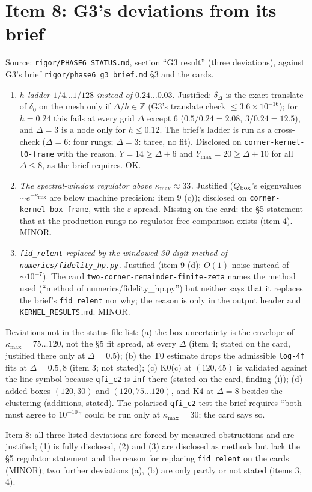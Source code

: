 \documentclass[11pt]{article}
\begin{document}
\section{Item 8: G3's deviations from its brief}
Source: \texttt{rigor/PHASE6\_STATUS.md}, section ``G3 result'' (three deviations), against G3's brief
\texttt{rigor/phase6\_g3\_brief.md} \S3 and the cards.
\begin{enumerate}[leftmargin=*]
\item \emph{$h$-ladder $1/4\ldots1/128$ instead of $0.24\ldots0.03$.} Justified: $\delta_\Delta$ is the exact translate of
$\delta_0$ on the mesh only if $\Delta/h\in\mathbb Z$ (G3's translate check $\le3.6\times10^{-16}$); for $h=0.24$ this fails at
every grid $\Delta$ except 6 ($0.5/0.24=2.08$, $3/0.24=12.5$), and $\Delta=3$ is a node only for $h\le0.12$. The brief's
ladder is run as a cross-check ($\Delta=6$: four rungs; $\Delta=3$: three, no fit). Disclosed on \texttt{corner-kernel-t0-frame}
with the reason. $Y=14\ge\Delta+6$ and $Y_{\max}=20\ge\Delta+10$ for all $\Delta\le8$, as the brief requires. OK.
\item \emph{The spectral-window regulator above $\kappa_{\max}\approx33$.} Justified ($Q_{\rm box}$'s eigenvalues
$\sim e^{-\kappa_{\max}}$ are below machine precision; item 9 (c)); disclosed on \texttt{corner-kernel-box-frame}, with the
$\varepsilon$-spread. Missing on the card: the \S5 statement that at the production rungs no regulator-free comparison exists
(item 4). MINOR.
\item \emph{\texttt{fid\_relent} replaced by the windowed 30-digit method of \texttt{numerics/fidelity\_hp.py}.} Justified
(item 9 (d): $O(1)$ noise instead of $\sim10^{-7}$). The card \texttt{two-corner-remainder-finite-zeta} names the method used
(``method of numerics/fidelity\_hp.py'') but neither says that it replaces the brief's \texttt{fid\_relent} nor why; the reason
is only in the output header and \texttt{KERNEL\_RESULTS.md}. MINOR.
\end{enumerate}
Deviations not in the status-file list: (a) the box uncertainty is the envelope of $\kappa_{\max}=75\ldots120$, not the \S5
fit spread, at every $\Delta$ (item 4; stated on the card, justified there only at $\Delta=0.5$); (b) the T0 estimate drops the
admissible \texttt{log-4f} fits at $\Delta=0.5,8$ (item 3; not stated); (c) K0(c) at $(120,45)$ is validated against the
line symbol because \texttt{qfi\_c2} is \texttt{inf} there (stated on the card, finding (i)); (d) added boxes $(120,30)$ and
$(120,75\ldots120)$, and K4 at $\Delta=8$ besides the clustering (additions, stated). The polarised-\texttt{qfi\_c2} test the
brief requires ``both must agree to $10^{-10}$'' could be run only at $\kappa_{\max}=30$; the card says so.
\begin{verdictok}
Item 8: all three listed deviations are forced by measured obstructions and are justified; (1) is fully disclosed, (2) and (3)
are disclosed as methods but lack the \S5 regulator statement and the reason for replacing \texttt{fid\_relent} on the cards
(MINOR); two further deviations (a), (b) are only partly or not stated (items 3, 4).
\end{verdictok}
\end{document}
